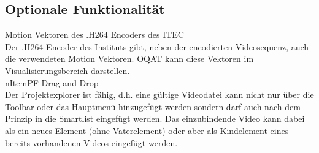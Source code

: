 \subsection{Optionale Funktionalität}
 Motion Vektoren des .H264 Encoders des \gls{ITEC}\\
Der .H264 Encoder des Instituts gibt, neben der encodierten Videosequenz, auch die verwendeten Motion
Vektoren. \gls{OQAT} kann diese Vektoren im Visualisierungsbereich darstellen.\\
nItem{PF} Drag and Drop\\
Der Projektexplorer ist  fähig, d.h. eine gültige Videodatei kann nicht nur über
die Toolbar oder das Hauptmenü hinzugefügt werden sondern darf auch nach dem  Prinzip
in die Smartlist eingefügt werden. Das einzubindende Video kann dabei als ein neues Element (ohne
Vaterelement) oder aber als Kindelement eines bereits vorhandenen Videos eingefügt werden.
%


